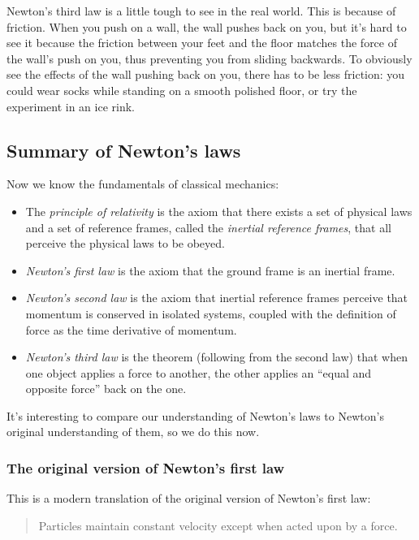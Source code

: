 \documentclass{article}
\begin{document}
Newton's third law is a little tough to see in the real world. This is because of friction. When you push on a wall, the wall pushes back on you, but it's hard to see it because the friction between your feet and the floor matches the force of the wall's push on you, thus preventing you from sliding backwards. To obviously see the effects of the wall pushing back on you, there has to be less friction: you could wear socks while standing on a smooth polished floor, or try the experiment in an ice rink.

\subsection*{Summary of Newton's laws}

Now we know the fundamentals of classical mechanics:

\begin{itemize}
    \item The \textit{principle of relativity} is the axiom that there exists a set of physical laws and a set of reference frames, called the \textit{inertial reference frames}, that all perceive the physical laws to be obeyed.
    \item \textit{Newton's first law} is the axiom that the ground frame is an inertial frame.
    \item \textit{Newton's second law} is the axiom that inertial reference frames perceive that momentum is conserved in isolated systems, coupled with the definition of force as the time derivative of momentum.
    \item \textit{Newton's third law} is the theorem (following from the second law) that when one object applies a force to another, the other applies an ``equal and opposite force'' back on the one.
\end{itemize}

It's interesting to compare our understanding of Newton's laws to Newton's original understanding of them, so we do this now.

\subsubsection*{The original version of Newton's first law}

This is a modern translation of the original version of Newton's first law:

\begin{quote}
    Particles maintain constant velocity except when acted upon by a force.
\end{quote}
\end{document}
